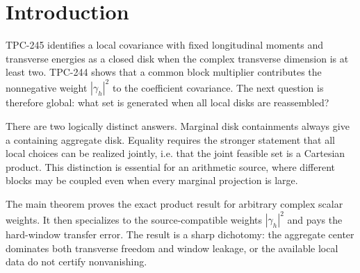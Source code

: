 \section{Introduction}

TPC-245 identifies a local covariance with fixed longitudinal moments and
transverse energies as a closed disk when the complex transverse dimension is
at least two.  TPC-244 shows that a common block multiplier contributes the
nonnegative weight $|\gamma_h|^2$ to the coefficient covariance.  The next
question is therefore global: what set is generated when all local disks are
reassembled?

There are two logically distinct answers.  Marginal disk containments always
give a containing aggregate disk.  Equality requires the stronger statement
that all local choices can be realized jointly, i.e. that the joint feasible
set is a Cartesian product.  This distinction is essential for an arithmetic
source, where different blocks may be coupled even when every marginal
projection is large.

The main theorem proves the exact product result for arbitrary complex scalar
weights.  It then specializes to the source-compatible weights
$|\gamma_h|^2$ and pays the hard-window transfer error.  The result is a sharp
dichotomy: the aggregate center dominates both transverse freedom and window
leakage, or the available local data do not certify nonvanishing.
